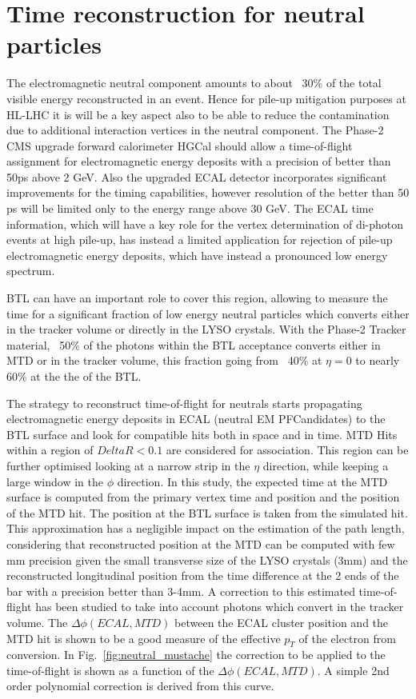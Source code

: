 \section{Time reconstruction for neutral particles}
\label{sec:neureco}
The electromagnetic neutral component amounts to about ~30\% of the total visible energy reconstructed in an event.
Hence for pile-up mitigation purposes at HL-LHC it is will be a key aspect also to be able to reduce the contamination due to additional interaction vertices in the neutral component.
The Phase-2 CMS upgrade forward calorimeter HGCal should allow a time-of-flight assignment for electromagnetic energy deposits with a precision of better than 50ps above 2 GeV. Also the upgraded ECAL detector incorporates significant improvements for the timing capabilities, however resolution of the better than 50 ps will be limited only to the energy range above 30 GeV. The ECAL time information, which will have a key role for the vertex determination of di-photon events at high pile-up, has instead a limited application for rejection of pile-up electromagnetic energy deposits, which have instead a pronounced low energy spectrum.

BTL can have an important role to cover this region, allowing to measure the time for a significant fraction of low energy neutral particles which converts either in the tracker volume or directly in the LYSO crystals. With the Phase-2 Tracker material, ~50\% of the photons within the BTL acceptance converts either in MTD or in the tracker volume, this fraction going from ~40\% at $\eta=0$ to nearly 60\% at the the of the BTL.

The strategy to reconstruct time-of-flight for neutrals starts propagating electromagnetic energy deposits in ECAL (neutral EM PFCandidates) to the BTL surface and look for compatible hits both in space and in time. MTD Hits within a region of $Delta R<0.1$ are considered for association. This region can be further optimised looking at a narrow strip in the $\eta$ direction, while keeping a large window in the $\phi$ direction.
In this study, the expected time at the MTD surface is computed from the primary vertex time and position and the position of the MTD hit. The position at the BTL surface is taken from the simulated hit. This approximation has a negligible impact on the estimation of the path length, considering that reconstructed position at the MTD can be computed with few mm precision given the small transverse size of the LYSO crystals (3mm) and the reconstructed longitudinal position from the time difference at the 2 ends of the bar  with a precision better than 3-4mm. A correction to this estimated time-of-flight has been studied to take into account photons which convert in the tracker volume. The $\Delta\phi(ECAL,MTD)$ between the ECAL cluster position and the MTD hit is shown to be a good measure of the effective $p_{T}$ of the electron from conversion. In Fig.~\ref{fig:neutral_mustache} the correction to be applied to the time-of-flight is shown as a function of the $\Delta\phi(ECAL,MTD)$. A simple 2nd order polynomial correction is derived from this curve.

